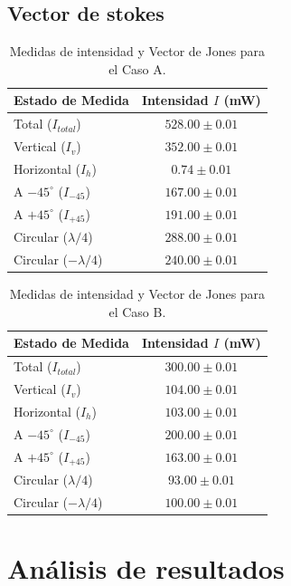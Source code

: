 \documentclass[11pt, a4paper, twocolumn]{article}
\begin{document}
\newpage
\subsection{Vector de stokes}

\begin{table}[h!]
\centering
\caption{Medidas de intensidad y Vector de Jones para el Caso A.}
\begin{tabular}{|l|c|}
\hline
\textbf{Estado de Medida} & \textbf{Intensidad $I$ (mW)} \\ \hline
Total ($I_{total}$) & $528.00 \pm 0.01$ \\ \hline
Vertical ($I_v$) & $352.00 \pm 0.01$ \\ \hline
Horizontal ($I_h$) & $0.74 \pm 0.01$ \\ \hline
A $-45^\circ$ ($I_{-45}$) & $167.00 \pm 0.01$ \\ \hline
A $+45^\circ$ ($I_{+45}$) & $191.00 \pm 0.01$ \\ \hline
Circular ($\lambda/4$) & $288.00 \pm 0.01$ \\ \hline
Circular ($-\lambda/4$) & $240.00 \pm 0.01$ \\ \hline
\end{tabular}
\label{Tabla_4}
\end{table}


\begin{table}[h!]
\centering
\caption{Medidas de intensidad y Vector de Jones para el Caso B.}
\begin{tabular}{|l|c|}
\hline
\textbf{Estado de Medida} & \textbf{Intensidad $I$ (mW)} \\ \hline
Total ($I_{total}$) & $300.00 \pm 0.01$ \\ \hline
Vertical ($I_v$) & $104.00 \pm 0.01$ \\ \hline
Horizontal ($I_h$) & $103.00 \pm 0.01$ \\ \hline
A $-45^\circ$ ($I_{-45}$) & $200.00 \pm 0.01$ \\ \hline
A $+45^\circ$ ($I_{+45}$) & $163.00 \pm 0.01$ \\ \hline
Circular ($\lambda/4$) & $93.00 \pm 0.01$ \\ \hline
Circular ($-\lambda/4$) & $100.00 \pm 0.01$ \\ \hline
\end{tabular}
\label{Tabla_5}
\end{table}

\vspace{0.5cm}


\section{Análisis de resultados}
\end{document}
